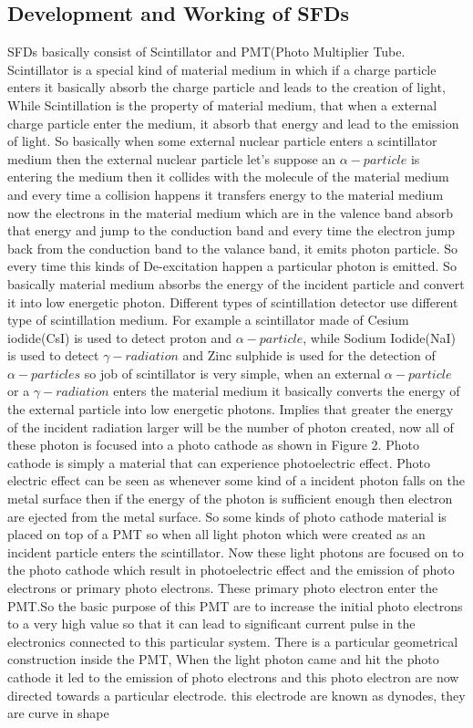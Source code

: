 \documentclass{article}
\begin{document}
\begin{multicols}{2}

\subsection{Development and Working of SFDs}
SFDs basically consist of Scintillator and PMT(Photo Multiplier Tube. Scintillator is a special kind of material medium in which if a charge particle enters it basically absorb the charge particle and leads to the creation of light, While Scintillation is the property of material medium, that when a external charge particle enter the medium, it absorb that energy and lead to the emission of light\cite{simon1992scintillating}. So basically when some external nuclear particle enters a scintillator medium then the external nuclear particle let's suppose an $\alpha-particle$ is entering the medium then it collides with the molecule of the material medium and every time a collision happens it transfers energy to the material medium now the electrons in the material medium which are in the valence band absorb that energy and jump to the conduction band and every time the electron jump back from the conduction band to the valance band, it emits photon particle. So every time this kinds of De-excitation happen a particular photon is emitted. So basically material medium  absorbs the energy of the incident particle and convert it into low energetic photon. Different types of scintillation detector use different type of scintillation medium. For example  a scintillator made of Cesium iodide(CsI) is used to detect proton and $\alpha-particle$, while Sodium Iodide(NaI) is used to detect $\gamma-radiation$ and Zinc sulphide is used for the detection of $\alpha-particles$ so job of scintillator is very simple, when an external $\alpha-particle$ or a $\gamma-radiation$ enters the material medium it basically converts the energy of the external particle into low energetic photons. Implies that greater the energy of the incident radiation larger will be the number of photon created, now all of these photon is focused into a photo cathode as shown in Figure 2. Photo cathode is simply a material that can experience photoelectric effect. Photo electric effect can be seen as whenever some kind of a incident photon falls on the metal surface then if the energy of the photon is sufficient enough then electron are ejected from the metal surface. So some kinds of photo cathode material is placed on top of a PMT so when all light photon which were created as an incident particle enters the scintillator. Now these light photons are focused on to the photo cathode which result in photoelectric effect and the emission of photo electrons or primary photo electrons. These primary photo electron enter the PMT.So the basic purpose of this PMT are to increase the initial photo electrons to a very high value so that it can lead to significant current pulse in the electronics connected to this particular system. There is a particular geometrical construction inside the PMT, When the light photon came and hit the photo cathode it led to the emission of photo electrons and this photo electron are now directed towards a particular electrode. this electrode are known as dynodes, they are curve in shape 
\end{multicols}
\end{document}
